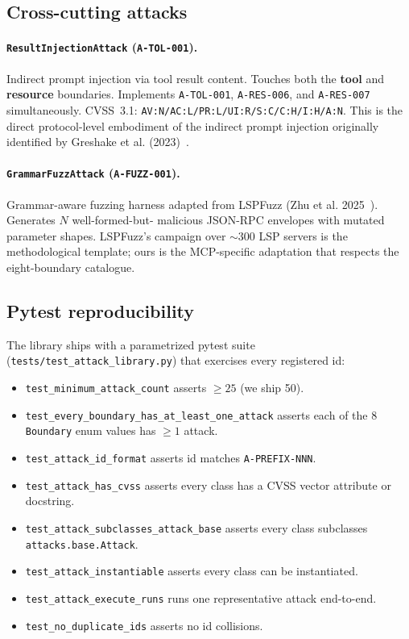 \subsection{Cross-cutting attacks}

\paragraph{\texttt{ResultInjectionAttack} (\texttt{A-TOL-001}).}
Indirect prompt injection via tool result content. Touches both
the \textbf{tool} and \textbf{resource} boundaries. Implements
\texttt{A-TOL-001}, \texttt{A-RES-006}, and \texttt{A-RES-007}
simultaneously. CVSS~3.1:
\texttt{AV:N/AC:L/PR:L/UI:R/S:C/C:H/I:H/A:N}. This is the
direct protocol-level embodiment of the indirect prompt
injection originally identified by Greshake et al.
(2023)~\cite{greshake_2023_indirect}.

\paragraph{\texttt{GrammarFuzzAttack} (\texttt{A-FUZZ-001}).}
Grammar-aware fuzzing harness adapted from LSPFuzz (Zhu et al.
2025~\cite{zhu_2025_lspfuzz}). Generates $N$ well-formed-but-
malicious JSON-RPC envelopes with mutated parameter shapes.
LSPFuzz's campaign over $\sim$300 LSP servers is the
methodological template; ours is the MCP-specific adaptation
that respects the eight-boundary catalogue.

\subsection{Pytest reproducibility}

The library ships with a parametrized pytest suite
(\texttt{tests/test\_attack\_library.py}) that exercises every
registered id:

\begin{itemize}
  \item \texttt{test\_minimum\_attack\_count} asserts $\geq 25$
        (we ship 50).
  \item \texttt{test\_every\_boundary\_has\_at\_least\_one\_attack}
        asserts each of the 8 \texttt{Boundary} enum values has
        $\geq 1$ attack.
  \item \texttt{test\_attack\_id\_format} asserts id matches
        \texttt{A-PREFIX-NNN}.
  \item \texttt{test\_attack\_has\_cvss} asserts every class
        has a CVSS vector attribute or docstring.
  \item \texttt{test\_attack\_subclasses\_attack\_base} asserts
        every class subclasses \texttt{attacks.base.Attack}.
  \item \texttt{test\_attack\_instantiable} asserts every class
        can be instantiated.
  \item \texttt{test\_attack\_execute\_runs} runs one
        representative attack end-to-end.
  \item \texttt{test\_no\_duplicate\_ids} asserts no id
        collisions.
\end{itemize}

